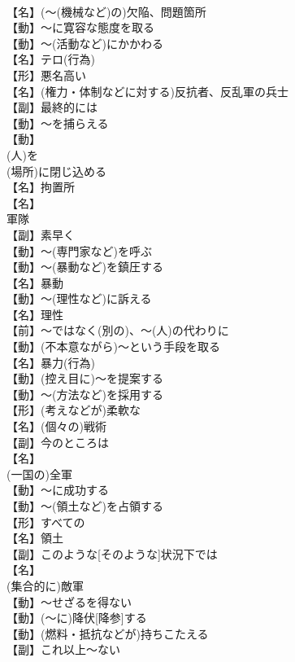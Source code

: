 \documentclass[8pt]{extreport}
\begin{document}
\begin{CJK}{UTF8}{min}
\\	【名】(～(機械など)の)欠陥、問題箇所
\\	【動】～に寛容な態度を取る
\\	【動】～(活動など)にかかわる
\\	【名】テロ(行為)
\\	【形】悪名高い
\\	【名】(権力・体制などに対する)反抗者、反乱軍の兵士
\\	【副】最終的には
\\	【動】～を捕らえる
\\	【動】
\\	(人)を
\\	(場所)に閉じ込める
\\	【名】拘置所
\\	【名】
\\	軍隊
\\	【副】素早く
\\	【動】～(専門家など)を呼ぶ
\\	【動】～(暴動など)を鎮圧する
\\	【名】暴動
\\	【動】～(理性など)に訴える
\\	【名】理性
\\	【前】～ではなく(別の)、～(人)の代わりに
\\	【動】(不本意ながら)～という手段を取る
\\	【名】暴力(行為)
\\	【動】(控え目に)～を提案する
\\	【動】～(方法など)を採用する
\\	【形】(考えなどが)柔軟な
\\	【名】(個々の)戦術
\\	【副】今のところは
\\	【名】
\\	(一国の)全軍
\\	【動】～に成功する
\\	【動】～(領土など)を占領する
\\	【形】すべての
\\	【名】領土
\\	【副】このような[そのような]状況下では
\\	【名】
\\	(集合的に)敵軍
\\	【動】～せざるを得ない
\\	【動】(～に)降伏[降参]する
\\	【動】(燃料・抵抗などが)持ちこたえる
\\	【副】これ以上～ない

\end{CJK}
\end{document}
